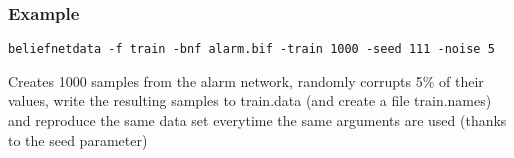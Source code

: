 \subsubsection*{Example}

{\tt }

{\tt beliefnetdata -f train -bnf alarm.bif -train 1000 -seed 111 -noise 5}

Creates 1000 samples from the alarm network, randomly corrupts 5\% of their values, write the resulting samples to train.data (and create a file train.names) and reproduce the same data set everytime the same arguments are used (thanks to the seed parameter)

